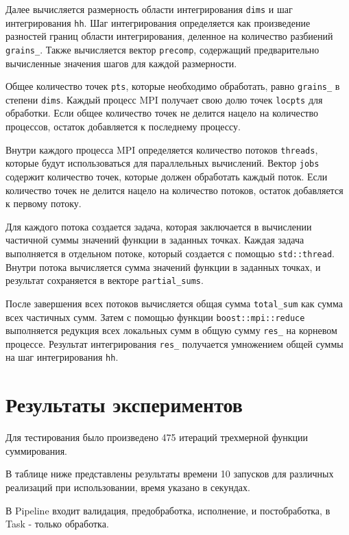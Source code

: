 \documentclass[12pt,a4paper]{extarticle}
\begin{document}
Далее вычисляется размерность области интегрирования \texttt{dims} и шаг интегрирования \texttt{hh}. Шаг интегрирования определяется как произведение разностей границ области интегрирования, деленное на количество разбиений \texttt{grains\_}. Также вычисляется вектор \texttt{precomp}, содержащий предварительно вычисленные значения шагов для каждой размерности.

Общее количество точек \texttt{pts}, которые необходимо обработать, равно \texttt{grains\_} в степени \texttt{dims}. Каждый процесс MPI получает свою долю точек \texttt{locpts} для обработки. Если общее количество точек не делится нацело на количество процессов, остаток добавляется к последнему процессу.

Внутри каждого процесса MPI определяется количество потоков \texttt{threads}, которые будут использоваться для параллельных вычислений. Вектор \texttt{jobs} содержит количество точек, которые должен обработать каждый поток. Если количество точек не делится нацело на количество потоков, остаток добавляется к первому потоку.

Для каждого потока создается задача, которая заключается в вычислении частичной суммы значений функции в заданных точках. Каждая задача выполняется в отдельном потоке, который создается с помощью \texttt{std::thread}. Внутри потока вычисляется сумма значений функции в заданных точках, и результат сохраняется в векторе \texttt{partial\_sums}.

После завершения всех потоков вычисляется общая сумма \texttt{total\_sum} как сумма всех частичных сумм. Затем с помощью функции \texttt{boost::mpi::reduce} выполняется редукция всех локальных сумм в общую сумму \texttt{res\_} на корневом процессе. Результат интегрирования \texttt{res\_} получается умножением общей суммы на шаг интегрирования \texttt{hh}.

\newpage
\section{Результаты экспериментов}
Для тестирования было произведено 475 итераций трехмерной функции суммирования.

В таблице ниже представлены результаты времени 10 запусков для различных реализаций при использовании, время указано в секундах.

В Pipeline входит валидация, предобработка, исполнение, и постобработка, в Task - только обработка.
\newline
\end{document}
